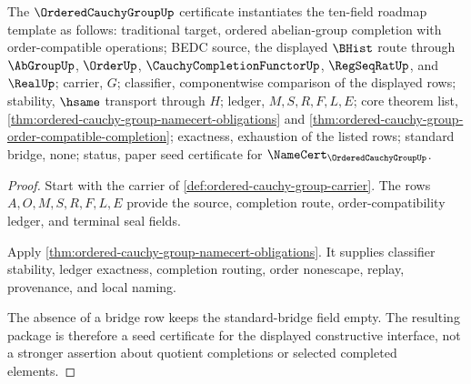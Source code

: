 \begin{theorem}
\label{thm:ordered-cauchy-group-ten-field-package}
The $\OrderedCauchyGroupUp$ certificate instantiates the ten-field roadmap template as follows: traditional target, ordered abelian-group completion with order-compatible operations; BEDC source, the displayed $\BHist$ route through $\AbGroupUp$, $\OrderUp$, $\CauchyCompletionFunctorUp$, $\RegSeqRatUp$, and $\RealUp$; carrier, $G$; classifier, componentwise comparison of the displayed rows; stability, $\hsame$ transport through $H$; ledger, $M,S,R,F,L,E$; core theorem list, \autoref{thm:ordered-cauchy-group-namecert-obligations} and \autoref{thm:ordered-cauchy-group-order-compatible-completion}; exactness, exhaustion of the listed rows; standard bridge, none; status, paper seed certificate for $\NameCert_{\OrderedCauchyGroupUp}$.
\end{theorem}
\begin{proof}
Start with the carrier of \autoref{def:ordered-cauchy-group-carrier}. The rows $A,O,M,S,R,F,L,E$ provide the source, completion route, order-compatibility ledger, and terminal seal fields.

Apply \autoref{thm:ordered-cauchy-group-namecert-obligations}. It supplies classifier stability, ledger exactness, completion routing, order nonescape, replay, provenance, and local naming.

The absence of a bridge row keeps the standard-bridge field empty. The resulting package is therefore a seed certificate for the displayed constructive interface, not a stronger assertion about quotient completions or selected completed elements.
\end{proof}

